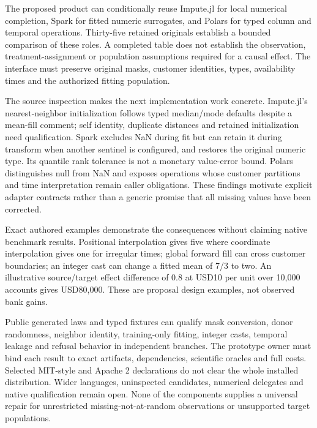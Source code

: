The proposed product can conditionally reuse Impute.jl for local
numerical completion, Spark for fitted numeric surrogates, and Polars
for typed column and temporal operations. Thirty-five retained originals
establish a bounded comparison of these roles. A completed table does
not establish the observation, treatment-assignment or population
assumptions required for a causal effect. The interface must preserve
original masks, customer identities, types, availability times and the
authorized fitting population.
\citep{exec25_otm_imputejl,exec25_otm_spark,exec25_otm_polars}

The source inspection makes the next implementation work concrete.
Impute.jl's nearest-neighbor initialization follows typed median/mode
defaults despite a mean-fill comment; self identity, duplicate distances
and retained initialization need qualification. Spark excludes NaN
during fit but can retain it during transform when another sentinel is
configured, and restores the original numeric type. Its quantile rank
tolerance is not a monetary value-error bound. Polars distinguishes null
from NaN and exposes operations whose customer partitions and time
interpretation remain caller obligations. These findings motivate
explicit adapter contracts rather than a generic promise that all
missing values have been corrected.
\citep{exec25_otm_imputejl,exec25_otm_spark,exec25_otm_polars,exec25_otm_choice}

Exact authored examples demonstrate the consequences without claiming
native benchmark results. Positional interpolation gives five where
coordinate interpolation gives one for irregular times; global forward
fill can cross customer boundaries; an integer cast can change a fitted
mean of 7/3 to two. An illustrative source/target effect difference of
0.8 at USD10 per unit over 10,000 accounts gives USD80,000. These are
proposal design examples, not observed bank gains.
\citep{exec25_otm_choice}

Public generated laws and typed fixtures can qualify mask conversion,
donor randomness, neighbor identity, training-only fitting, integer
casts, temporal leakage and refusal behavior in independent branches.
The prototype owner must bind each result to exact artifacts,
dependencies, scientific oracles and full costs. Selected MIT-style and
Apache 2 declarations do not clear the whole installed distribution.
Wider languages, uninspected candidates, numerical delegates and native
qualification remain open. None of the components supplies a universal
repair for unrestricted missing-not-at-random observations or
unsupported target populations.
\citep{exec25_otm_imputejl,exec25_otm_spark,exec25_otm_polars,exec25_otm_choice}

